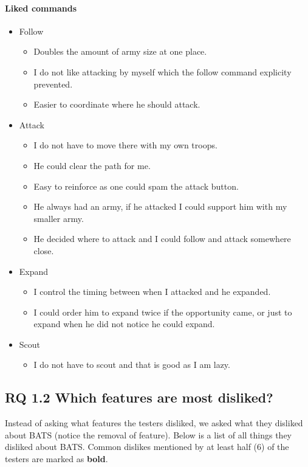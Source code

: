 \paragraph{Liked commands}
\begin{itemize}
	\item Follow
	\begin{itemize}
		\item Doubles the amount of army size at one place.
		\item I do not like attacking by myself which the follow command explicity prevented.
		\item Easier to coordinate where he should attack.
	\end{itemize}
	\item Attack
	\begin{itemize}
		\item I do not have to move there with my own troops.
		\item He could clear the path for me.
		\item Easy to reinforce as one could spam the attack button.
		\item He always had an army, if he attacked I could support him with my smaller army.
		\item He decided where to attack and I could follow and attack somewhere close.
	\end{itemize}
	\item Expand
	\begin{itemize}
		\item I control the timing between when I attacked and he expanded.
		\item I could order him to expand twice if the opportunity came, or just to expand when he did not notice he could expand.
	\end{itemize}
	\item Scout
	\begin{itemize}
		\item I do not have to scout and that is good as I am lazy.
	\end{itemize}
\end{itemize}

\subsection{RQ 1.2 Which features are most disliked?}
Instead of asking what features the testers disliked, we asked what they disliked about BATS (notice the removal of feature). Below is a list of all things they disliked about BATS. Common dislikes mentioned by at least half (6) of the testers are marked as \textbf{bold}.
